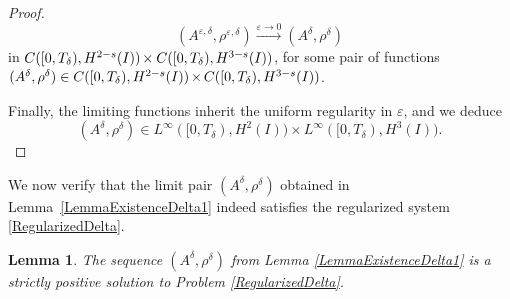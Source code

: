 \documentclass[12pt]{amsart}
\newtheorem{lemma}{Lemma}
\begin{document}
\begin{proof}
    \begin{equation}\label{Convergence}
        (A^{\varepsilon,\delta},\rho^{\varepsilon,\delta})\overset{\varepsilon\rightarrow 0}{\longrightarrow}(A^\delta,\rho^\delta)
        \end{equation}
         in  $C([0,T_\delta),H^{2-s}(I))\hspace{-0.03cm}\times C([0,T_\delta),H^{3-s}(I))$,
    for some pair of functions $(A^\delta,\rho^\delta)\in C([0,T_\delta),H^{2-s}(I))\hspace{-0.03cm}\times\hspace{-0.03cm} C([0,T_\delta),H^{3-s}(I))$. 	

Finally, the limiting functions inherit the uniform regularity in $\varepsilon$, and we deduce
    \begin{equation*}
	 (A^\delta,\rho^\delta)\in L^\infty([0,T_\delta),H^{2}(I))\times L^\infty([0,T_\delta),H^{3}(I)).
\end{equation*}
\end{proof}

We now verify that the limit pair $(A^\delta,\rho^\delta)$ obtained in Lemma~\ref{LemmaExistenceDelta1} indeed satisfies the regularized system \eqref{RegularizedDelta}. 

\begin{lemma}\label{LemmaExistenceDelta2}
	The sequence $(A^\delta,\rho^\delta)$ from Lemma \ref{LemmaExistenceDelta1} is a strictly positive solution to Problem \eqref{RegularizedDelta}.
\end{lemma}
\end{document}
